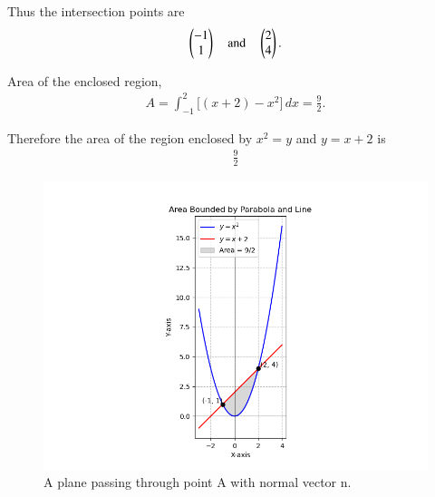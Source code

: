 \documentclass[journal]{IEEEtran}
\begin{document}
Thus the intersection points are 
\begin{align}
\begin{pmatrix}-1\\1\end{pmatrix} \quad \text{and} \quad \begin{pmatrix}2\\4\end{pmatrix}.
\end{align}

Area of the enclosed region,
\begin{align}
A=\int_{-1}^{2}\big[(x+2)-x^{2}\big]\,dx
=\frac{9}{2}.
\end{align}

Therefore the area of the region enclosed by \(x^2=y\) and \(y=x+2\) is
\begin{align*}
\boxed{\tfrac{9}{2}}
\end{align*}
\begin{figure}[H]
\begin{center}
\includegraphics[width=0.9\columnwidth]{figs/fig2.png}
\end{center}
\caption{A plane passing through point A with normal vector n.}
\label{fig:Fig.1}
\end{figure}
\end{document}
